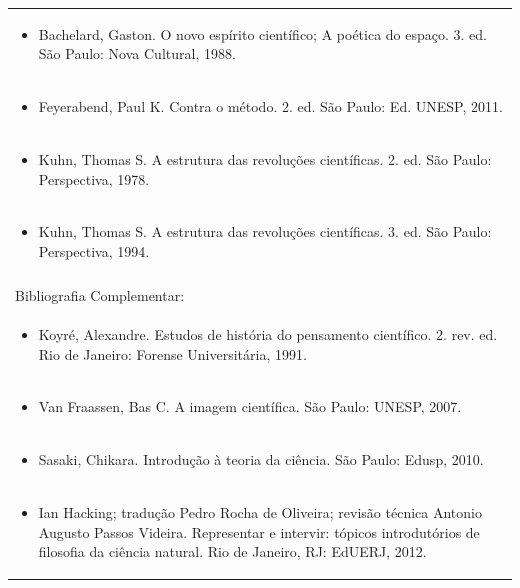 \documentclass[11pt]{article}
\begin{document}
\begin{center}
\begin{longtable}{|p{4cm}|p{4cm}|p{4cm}|p{4cm}|}
\multicolumn{4}{|p{\dimexpr 16cm + 6\tabcolsep\relax}|}{\begin{itemize}\item Bachelard, Gaston. O novo espírito científico; A poética do espaço. 3. ed. São Paulo: Nova Cultural, 1988.\end{itemize}}\\
\multicolumn{4}{|p{\dimexpr 16cm + 6\tabcolsep\relax}|}{\begin{itemize}\item Feyerabend, Paul K. Contra o método. 2. ed. São Paulo: Ed. UNESP, 2011.\end{itemize}}\\
\multicolumn{4}{|p{\dimexpr 16cm + 6\tabcolsep\relax}|}{\begin{itemize}\item Kuhn, Thomas S. A estrutura das revoluções científicas. 2. ed. São Paulo: Perspectiva, 1978.\end{itemize}}\\
\multicolumn{4}{|p{\dimexpr 16cm + 6\tabcolsep\relax}|}{\begin{itemize}\item Kuhn, Thomas S. A estrutura das revoluções científicas. 3. ed. São Paulo: Perspectiva, 1994.\end{itemize}}\\
\multicolumn{4}{|p{16cm}|}{}\\
\hline
\multicolumn{4}{|p{16cm}|}{Bibliografia Complementar:}\\*
\multicolumn{4}{|p{\dimexpr 16cm + 6\tabcolsep\relax}|}{\begin{itemize}\item Koyré, Alexandre. Estudos de história do pensamento científico. 2. rev. ed. Rio de Janeiro: Forense Universitária, 1991.\end{itemize}}\\
\multicolumn{4}{|p{\dimexpr 16cm + 6\tabcolsep\relax}|}{\begin{itemize}\item Van Fraassen, Bas C. A imagem científica. São Paulo: UNESP, 2007.\end{itemize}}\\
\multicolumn{4}{|p{\dimexpr 16cm + 6\tabcolsep\relax}|}{\begin{itemize}\item Sasaki, Chikara. Introdução à teoria da ciência. São Paulo: Edusp, 2010.\end{itemize}}\\
\multicolumn{4}{|p{\dimexpr 16cm + 6\tabcolsep\relax}|}{\begin{itemize}\item Ian Hacking; tradução Pedro Rocha de Oliveira; revisão técnica Antonio Augusto Passos Videira. Representar e intervir: tópicos introdutórios de filosofia da ciência natural. Rio de Janeiro, RJ: EdUERJ, 2012.\end{itemize}}\\

\end{longtable}
\end{center}
\end{document}
